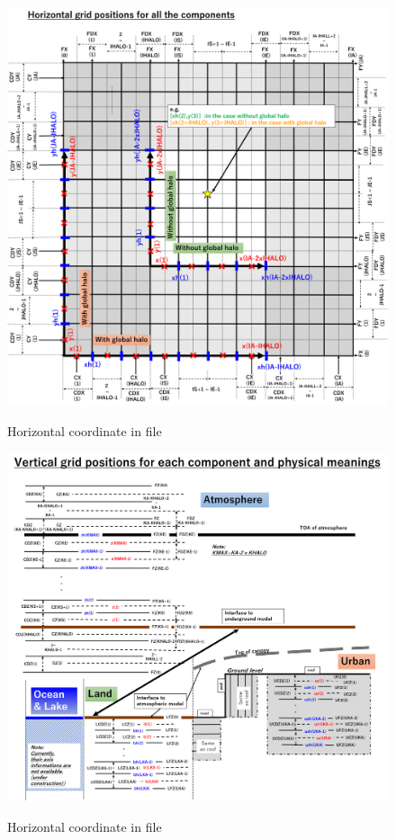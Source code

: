 \begin{figure}[tbh]
\begin{center}
  \includegraphics[width=1.0\hsize]{./figure/horizontal-coordinate-final.png}\\
  \caption{Horizontal coordinate in \scalenetcdf file}
  \label{fig:netcdfhorizontalcoordinate}
\end{center}
\end{figure}
\begin{figure}[tbh]
\begin{center}
  \includegraphics[width=1.0\hsize]{./figure/vertical_coordinate_final.png}\\
  \caption{Horizontal coordinate in \scalenetcdf file}
  \label{fig:netcdfverticalcoordinate}
\end{center}
\end{figure}



